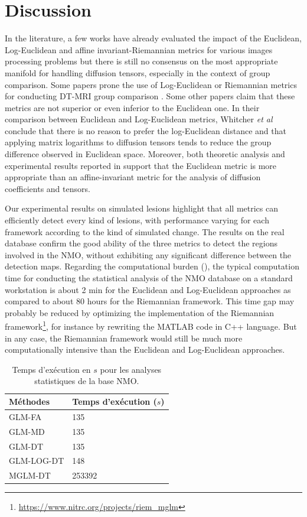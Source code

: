 \section{Discussion}

In the literature, a few works have already evaluated the impact of the Euclidean, Log-Euclidean and affine invariant-Riemannian metrics
 for various images processing problems \cite{Arsigny2006, Pasternak2010} but there is still no consensus on the most appropriate manifold for handling diffusion tensors, 
especially in the context of group comparison.
Some papers prone the use of  Log-Euclidean or Riemannian metrics for conducting DT-MRI group comparison \cite{Zhu2009, Schwartzman2010, Yuan2012, Kim2014}.
Some other papers claim that these metrics are not superior \cite{Whitcher2007} or even inferior \cite{Pasternak2010} to the Euclidean one. In their comparison between Euclidean
and Log-Euclidean metrics, Whitcher \textit{et al}  \cite{Whitcher2007} conclude that there is no reason to prefer the log-Euclidean distance and that
applying matrix logarithms to diffusion tensors tends to reduce the group difference observed in Euclidean space.
Moreover, both theoretic analysis and experimental results reported in \cite{Pasternak2010} support that the Euclidean metric is more appropriate than an affine-invariant metric for the analysis of diffusion coefficients and tensors.

Our experimental results on simulated lesions highlight that all metrics can efficiently detect every kind of lesions,
with performance varying for each framework according to the kind of simulated change.
The results on the real database confirm the good ability of the three metrics to detect the regions
involved in the NMO, without exhibiting any significant difference between the detection maps.
Regarding the computational burden (), 
the typical computation time for conducting the statistical analysis of the NMO database on a standard workstation 
is about 2 min for the Euclidean and Log-Euclidean approaches as compared to about 80 hours for the Riemannian framework. 
This time gap may probably be reduced by optimizing the implementation of the Riemannian framework\footnote{\url{https://www.nitrc.org/projects/riem\_mglm}},
for instance by rewriting the MATLAB code in C++ language.
But in any case, the Riemannian framework would still be much more computationally intensive than the Euclidean and Log-Euclidean approaches.


\begin{table}[htbp]
\centering
\begin{tabular}{|D{4cm}|D{4cm}|}
      \hline
      \textbf{Méthodes} & \textbf{Temps d'exécution ($s$)} \tabularnewline
      \hline
      GLM-FA & 135 \tabularnewline
      GLM-MD & 135 \tabularnewline
      GLM-DT & 135 \tabularnewline
      GLM-LOG-DT & 148 \tabularnewline
      MGLM-DT & 253392 \tabularnewline
      \hline
  \end{tabular}
  \caption{\label{tab:cpu_time} Temps d'exécution en $s$ pour les analyses statistiques de la base NMO.}
\end{table}

